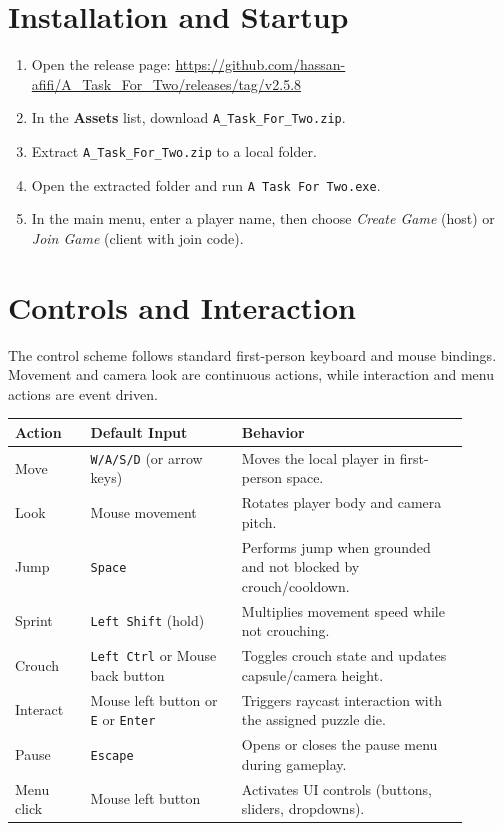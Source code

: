 \section{Installation and Startup}
\begin{enumerate}
\item Open the release page: \url{https://github.com/hassan-afifi/A_Task_For_Two/releases/tag/v2.5.8}
\item In the \textbf{Assets} list, download \texttt{A\_Task\_For\_Two.zip}.
\item Extract \texttt{A\_Task\_For\_Two.zip} to a local folder.
\item Open the extracted folder and run \texttt{A Task For Two.exe}.
\item In the main menu, enter a player name, then choose \textit{Create Game} (host) or \textit{Join Game} (client with join code).
\end{enumerate}

\section{Controls and Interaction}
The control scheme follows standard first-person keyboard and mouse bindings. Movement and camera look are continuous actions, while interaction and menu actions are event driven.

\begin{table}[H]
\centering
\caption{Default Keyboard and Mouse Controls}
\label{tab:default-controls}
\begin{longtable}{|>{\centering\arraybackslash}m{0.15\linewidth}|>{\centering\arraybackslash}m{0.3\linewidth}|>{\centering\arraybackslash}m{0.45\linewidth}|}
\hline
\hline
\textbf{Action} & \textbf{Default Input} & \textbf{Behavior} \\
\hline
Move & \texttt{W/A/S/D} (or arrow keys) & Moves the local player in first-person space. \\
\hline
Look & Mouse movement & Rotates player body and camera pitch. \\
\hline
Jump & \texttt{Space} & Performs jump when grounded and not blocked by crouch/cooldown. \\
\hline
Sprint & \texttt{Left Shift} (hold) & Multiplies movement speed while not crouching. \\
\hline
Crouch & \texttt{Left Ctrl} or Mouse back button & Toggles crouch state and updates capsule/camera height. \\
\hline
Interact & Mouse left button or \texttt{E} or \texttt{Enter} & Triggers raycast interaction with the assigned puzzle die. \\
\hline
Pause & \texttt{Escape} & Opens or closes the pause menu during gameplay. \\
\hline
Menu click & Mouse left button & Activates UI controls (buttons, sliders, dropdowns). \\
\hline
\end{longtable}
\addtocounter{table}{-1}
\end{table}


